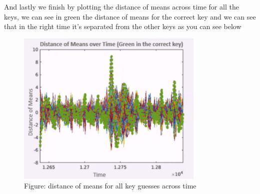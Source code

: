 And lastly we finish by plotting the distance of means across time for all the keys, we can see in green the distance of means for the correct key and we can see that in the right time it's separated from the other keys as you can see below
\begin{figure}[H]
\centering
\includegraphics[width=0.8\textwidth]{images/Lecture6/all.png}
\caption{Figure: distance of means for all key guesses across time}
\label{fig:DPA_Illustration}
\end{figure}
